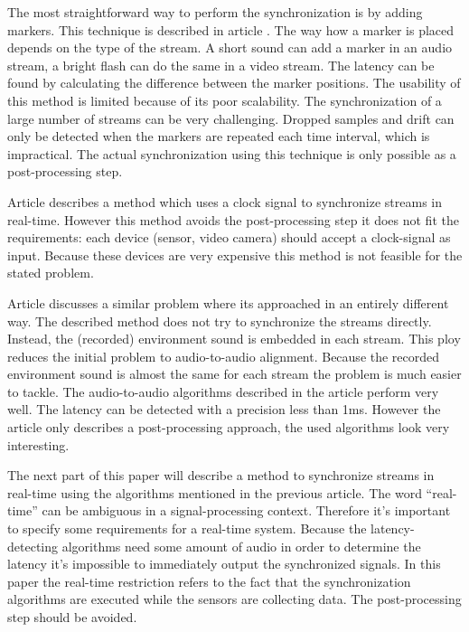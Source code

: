 \documentclass[twocolumn]{phdsymp} %
\begin{document}
The most straightforward way to perform the synchronization is by adding markers. This technique is described in article \cite{bannach2009automatic}. The way how a marker is placed depends on the type of the stream. A short sound can add a marker in an audio stream, a bright flash can do the same in a video stream. The latency can be found by calculating the difference between the marker positions. The usability of this method is limited because of its poor scalability. The synchronization of a large number of streams can be very challenging. Dropped samples and drift can only be detected when the markers are repeated each time interval, which is impractical. The actual synchronization using this technique is only possible as a post-processing step.

Article \cite{jaimovich2010synchronization} describes a method which uses a clock signal to synchronize streams in real-time. However this method avoids the post-processing step it does not fit the requirements: each device (sensor, video camera) should accept a clock-signal as input. Because these devices are very expensive this method is not feasible for the stated problem.

Article \cite{six2015multimodal} discusses a similar problem where its approached in an entirely different way. The described method does not try to synchronize the streams directly. Instead, the (recorded) environment sound is embedded in each stream. This ploy reduces the initial problem to audio-to-audio alignment. Because the recorded environment sound is almost the same for each stream the problem is much easier to tackle. The audio-to-audio algorithms described in the article perform very well. The latency can be detected with a precision less than 1ms. However the article only describes a post-processing approach, the used algorithms look very interesting.

The next part of this paper will describe a method to synchronize streams in real-time using the algorithms mentioned in the previous article. The word ``real-time'' can be ambiguous in a signal-processing context. Therefore it's important to specify some requirements for a real-time system. Because the latency-detecting algorithms need some amount of audio in order to determine the latency it's impossible to immediately output the synchronized signals. In this paper the real-time restriction refers to the fact that the synchronization algorithms are executed while the sensors are collecting data. The post-processing step should be avoided.
\end{document}
